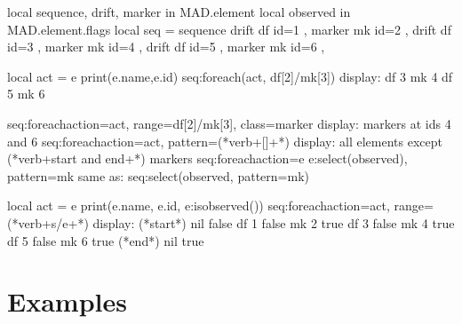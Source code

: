 \documentclass[letterpaper,10pt,english]{sphinxmanual}
\begin{document}
\begin{sphinxVerbatim}[commandchars=\\\{\}]
local sequence, drift, marker in MAD.element
local observed in MAD.element.flags
local seq = sequence \PYGZob{}
drift \PYGZsq{}df\PYGZsq{} \PYGZob{} id=1 \PYGZcb{}, marker \PYGZsq{}mk\PYGZsq{} \PYGZob{} id=2 \PYGZcb{},
drift \PYGZsq{}df\PYGZsq{} \PYGZob{} id=3 \PYGZcb{}, marker \PYGZsq{}mk\PYGZsq{} \PYGZob{} id=4 \PYGZcb{},
drift \PYGZsq{}df\PYGZsq{} \PYGZob{} id=5 \PYGZcb{}, marker \PYGZsq{}mk\PYGZsq{} \PYGZob{} id=6 \PYGZcb{},
\PYGZcb{}

local act = \PYGZbs{}e \PYGZhy{}\PYGZgt{} print(e.name,e.id)
seq:foreach(act, \PYGZdq{}df[2]/mk[3]\PYGZdq{})
\PYGZhy{}\PYGZhy{} display:
df   3
mk   4
df   5
mk   6

seq:foreach\PYGZob{}action=act, range=\PYGZdq{}df[2]/mk[3]\PYGZdq{}, class=marker\PYGZcb{}
\PYGZhy{}\PYGZhy{} display: markers at ids 4 and 6
seq:foreach\PYGZob{}action=act, pattern=(*\PYGZbs{}verb+\PYGZdq{}\PYGZca{}[\PYGZca{}\PYGZdl{}]\PYGZdq{}+*)\PYGZcb{}
\PYGZhy{}\PYGZhy{} display: all elements except (*\PYGZbs{}verb+\PYGZdl{}start and \PYGZdl{}end+*) markers
seq:foreach\PYGZob{}action=\PYGZbs{}e \PYGZhy{}\PYGZgt{} e:select(observed), pattern=\PYGZdq{}mk\PYGZdq{}\PYGZcb{}
\PYGZhy{}\PYGZhy{} same as: seq:select(observed, \PYGZob{}pattern=\PYGZdq{}mk\PYGZdq{}\PYGZcb{})

local act = \PYGZbs{}e \PYGZhy{}\PYGZgt{} print(e.name, e.id, e:is\PYGZus{}observed())
seq:foreach\PYGZob{}action=act, range=(*\PYGZbs{}verb+\PYGZdq{}\PYGZsh{}s/\PYGZsh{}e\PYGZdq{}+*)\PYGZcb{}
\PYGZhy{}\PYGZhy{} display:
(*\PYGZbs{}\PYGZdl{}start*)   nil  false
df       1    false
mk       2    true
df       3    false
mk       4    true
df       5    false
mk       6    true
(*\PYGZbs{}\PYGZdl{}end*)     nil  true
\end{sphinxVerbatim}


\section{Examples}
\label{\detokenize{sequences:examples}}
\end{document}
